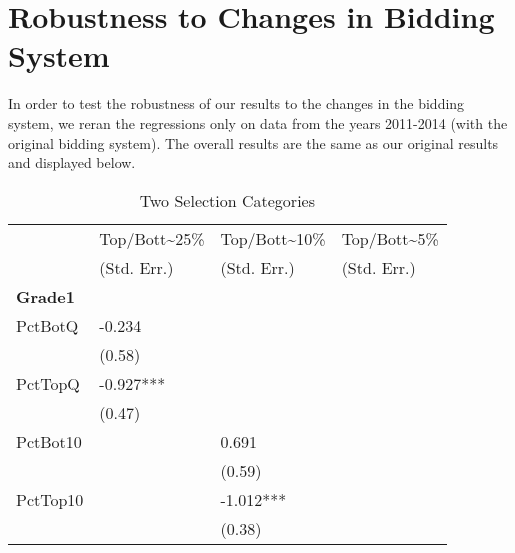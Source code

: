 \clearpage{}

\section{Robustness to Changes in Bidding System}\label{appendix:d}

In order to test the robustness of our results to the changes in the bidding system, we reran the regressions only on data from the years 2011-2014 (with the original bidding system). 
The overall results are the same as our original results and displayed below. 
\bigskip
\begin{table}[!htb]
  \centering
  \begin{threeparttable}
    \caption{Two Selection Categories}\label{tab:d1}
    \begin{tabular}{l l l l} 
      \hline
      \hline
                      & Top/Bott{\textasciitilde}25\% & Top/Bott{\textasciitilde}10\% & Top/Bott{\textasciitilde}5\% \\
                      & (Std. Err.)                   & (Std. Err.)                   & (Std. Err.)                  \\
      \hline
      \textbf{Grade1} &                               &                               &                              \\
      PctBotQ         & -0.234                        &                               &                              \\
                      & (0.58)                        &                               &                              \\
      PctTopQ         & -0.927***                     &                               &                              \\
                      & (0.47)                        &                               &                              \\
      PctBot10        &                               & 0.691                         &                              \\
                      &                               & (0.59)                        &                              \\
      PctTop10        &                               & -1.012***                     &                              \\
                      &                               & (0.38)                        &                              \\

\end{tabular}
\end{threeparttable}
\end{table}
